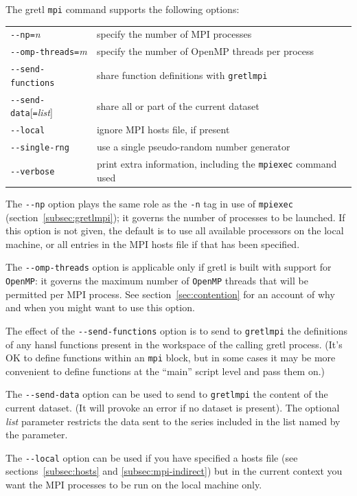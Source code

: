 \documentclass{article}
\begin{document}
The gretl \texttt{mpi} command supports the following options:
\begin{center}
\begin{tabular}{ll}
\verb|--|\texttt{np=}\textsl{n} & specify the number of MPI processes\\
\verb|--|\texttt{omp-threads=}\textsl{m} &
  specify the number of OpenMP threads per process \\
\verb|--|\texttt{send-functions} &
  share function definitions with \texttt{gretlmpi} \\
\verb|--|\texttt{send-data}[\texttt{=}\textsl{list}] &
  share all or part of the current dataset \\
\verb|--|\texttt{local} & ignore MPI hosts file, if present \\
\verb|--|\texttt{single-rng} &
  use a single pseudo-random number generator \\
\verb|--|\texttt{verbose} & print extra information, including
  the \texttt{mpiexec} command used
\end{tabular}
\end{center}

The \verb|--np| option plays the same role as the \verb|-n| tag in use
of \texttt{mpiexec} (section~\ref{subsec:gretlmpi}); it governs
the number of processes to be launched. If this option is not given,
the default is to use all available processors on the local machine,
or all entries in the MPI hosts file if that has been specified.

The \verb|--omp-threads| option is applicable only if gretl is built
with support for \texttt{OpenMP}: it governs the maximum number of
\texttt{OpenMP} threads that will be permitted per MPI process.  See
section~\ref{sec:contention} for an account of why and when you might
want to use this option.

The effect of the \verb|--send-functions| option is to send to
\texttt{gretlmpi} the definitions of any hansl functions present
in the workspace of the calling gretl process. (It's OK to define
functions within an \texttt{mpi} block, but in some cases it may be more
convenient to define functions at the ``main'' script level and pass
them on.)

The \verb|--send-data| option can be used to send to \texttt{gretlmpi}
the content of the current dataset. (It will provoke an error if no
dataset is present). The optional \textsl{list} parameter restricts
the data sent to the series included in the list named by the
parameter.

The \verb|--local| option can be used if you have specified a hosts
file (see sections~\ref{subsec:hosts} and \ref{subsec:mpi-indirect})
but in the current context you want the MPI processes to be run on the
local machine only.
\end{document}
